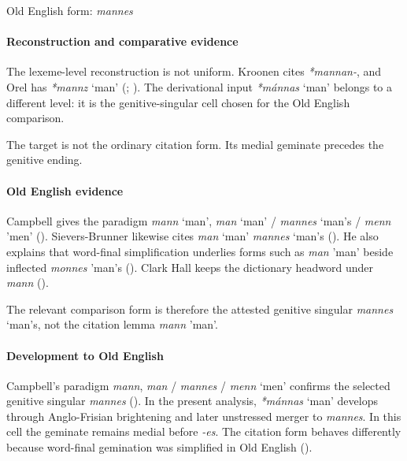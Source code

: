 \documentclass[
  british,
  a4paper,
]{article}
\providecommand{\Recon}[1]{\emph{*#1}}
\begin{document}
Old English form: \emph{mannes}

\paragraph{Reconstruction and comparative
evidence}\label{reconstruction-and-comparative-evidence-138}

The lexeme-level reconstruction is not uniform. Kroonen cites
\emph{*mannan-}, and Orel has \Recon{mannz} `man'
(;
). The derivational input
\Recon{mánnas} `man' belongs to a different level: it is the
genitive-singular cell chosen for the Old English comparison.

The target is not the ordinary citation form. Its medial geminate
precedes the genitive ending.

\paragraph{Old English evidence}\label{old-english-evidence-140}

Campbell gives the paradigm {\emph{mann}} `man', {\emph{man}} `man' /
{\emph{mannes}} `man's / {\emph{menn}} 'men'
(). Sievers-Brunner
likewise cites {\emph{man}} `man' {\emph{mannes}} `man's
(). He also
explains that word-final simplification underlies forms such as
{\emph{man}} 'man' beside inflected {\emph{monnes}} 'man's
(). Clark Hall
keeps the dictionary headword under {\emph{mann}}
().

The relevant comparison form is therefore the attested genitive singular
{\emph{mannes}} `man's, not the citation lemma {\emph{mann}} 'man'.

\paragraph{Development to Old
English}\label{development-to-old-english-138}

Campbell's paradigm \emph{mann}, \emph{man} / \emph{mannes} /
{\emph{menn}} `men' confirms the selected genitive singular
\emph{mannes} ().
In the present analysis, \Recon{mánnas} `man' develops through
Anglo-Frisian brightening and later unstressed merger to \emph{mannes}.
In this cell the geminate remains medial before \emph{-es}. The citation
form behaves differently because word-final gemination was simplified in
Old English ().
\end{document}
